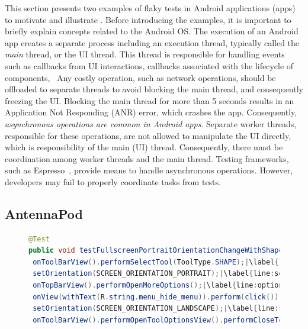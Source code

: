 \documentclass[conference]{IEEEtran}
\begin{document}
This section presents two examples of flaky tests in Android applications (apps) to motivate and illustrate \tname{}. Before introducing the examples, it is important to briefly explain concepts related to the Android OS. The execution of an Android app creates a separate process including an execution thread, typically called the \emph{main} thread, or the UI thread. This thread is responsible for handling events such as callbacks from UI interactions, callbacks associated with the lifecycle of components, \etc\ Any costly operation, such as network operations, should be offloaded to separate threads to avoid blocking the main thread, and consequently freezing the UI. Blocking the main thread for more than 5 seconds results in an Application Not Responding (ANR) error, which crashes the app. Consequently, \emph{asynchronous operations are common in Android apps}. Separate worker threads, responsible for these operations, are not allowed to manipulate the UI directly, which is responsibility of the main (UI) thread. Consequently, there must be coordination among worker threads and the main thread. Testing frameworks, such as Espresso~\cite{espresso-2020}, provide means to handle asynchronous operations. However, developers may fail to properly coordinate tasks from tests.

%

\subsection{AntennaPod}


\begin{figure}[t!]
\begin{lstlisting}[language=Java, caption=Paintroid Test, label=PaintroidTest, escapechar=|, keywords={@Test, perform, performSelectTool, performOpenMoreOptions, performOpenToolOptionsView, performCloseToolOptionsView, await}]
@Test
public void testFullscreenPortraitOrientationChangeWithShape() {
 onToolBarView().performSelectTool(ToolType.SHAPE);|\label{line:selectShape}|
 setOrientation(SCREEN_ORIENTATION_PORTRAIT);|\label{line:setPortrait}|
 onTopBarView().performOpenMoreOptions();|\label{line:optionsMenu}|
 onView(withText(R.string.menu_hide_menu)).perform(click());|\label{line:fullScreen}|
 setOrientation(SCREEN_ORIENTATION_LANDSCAPE);|\label{line:setLandscape}| pressBack();|\label{line:pressBack}|
 onToolBarView().performOpenToolOptionsView().performCloseToolOptionsView();|\label{line:closeToolOptions}| }
\end{lstlisting}
\end{figure}
\end{document}
